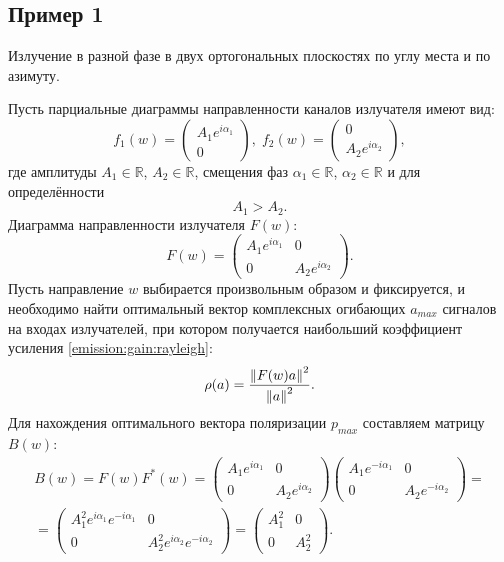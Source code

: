 \subsection{Пример 1}

Излучение в разной фазе в двух ортогональных плоскостях по углу места и по азимуту.

Пусть парциальные диаграммы направленности каналов излучателя имеют вид:
\[
    f_1(w) = \begin{pmatrix}
                 A_1 e^{i \alpha_1} \\
                 0
    \end{pmatrix}
    , \;
    f_2(w) = \begin{pmatrix}
                 0 \\
                 A_2 e^{i \alpha_2}
    \end{pmatrix} ,
\]
где амплитуды $A_1 \in \mathbb{R}$, $A_2 \in \mathbb{R}$, смещения фаз $\alpha_1 \in \mathbb{R}$, $\alpha_2 \in \mathbb{R}$ и для определённости
\[
    A_1 > A_2 .
\]
Диаграмма направленности излучателя $F(w)$:
\[
    F(w) = \begin{pmatrix}
               A_1 e^{i \alpha_1} & 0 \\
               0                  & A_2 e^{i \alpha_2}
    \end{pmatrix} .
\]
Пусть направление $w$ выбирается произвольным образом и фиксируется, и необходимо найти оптимальный вектор комплексных огибающих $a_{max}$
сигналов на входах излучателей, при котором получается наибольший коэффициент усиления \eqref{emission:gain:rayleigh}:
\[
    \rho(a)
    = \frac{\left \| F(w) a \right \|^2}{\left \| a \right \|^2}.
\]
Для нахождения оптимального вектора поляризации $p_{max}$ составляем матрицу $B(w)$:
\begin{multline*}
    B(w)
    = F(w) F^*(w)
    = \begin{pmatrix}
          A_1 e^{i \alpha_1} & 0 \\
          0                  & A_2 e^{i \alpha_2}
    \end{pmatrix}
    \begin{pmatrix}
        A_1 e^{- i \alpha_1} & 0 \\
        0                    & A_2 e^{- i \alpha_2}
    \end{pmatrix} = \\
    = \begin{pmatrix}
          A_1^2 e^{i \alpha_1} e^{- i \alpha_1} & 0 \\
          0                                 & A_2^2 e^{i \alpha_2} e^{- i \alpha_2}
    \end{pmatrix}
    = \begin{pmatrix}
          A_1^2 & 0 \\
          0     & A_2^2
    \end{pmatrix} .
\end{multline*}
